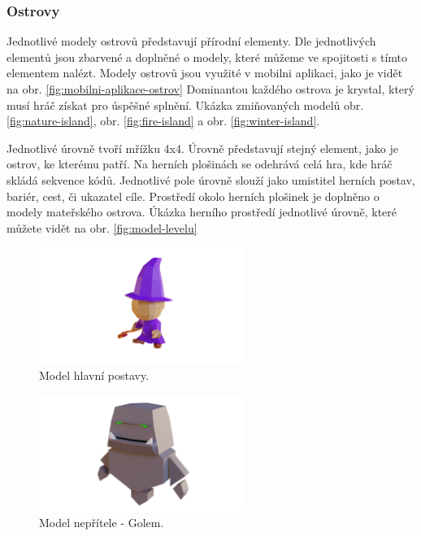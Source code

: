 \subsubsection{Ostrovy}
Jednotlivé modely ostrovů představují přírodní elementy. Dle jednotlivých elementů jsou zbarvené a doplněné o modely, které můžeme ve spojitosti s tímto elementem nalézt. Modely ostrovů jsou využité v mobilni aplikaci, jako je vidět na obr. \ref{fig:mobilni-aplikace-ostrov} Dominantou každého ostrova je krystal, který musí hráč získat pro úspěšné splnění. Ukázka zmiňovaných modelů obr. \ref{fig:nature-island}, obr. \ref{fig:fire-island} a obr. \ref{fig:winter-island}.

Jednotlivé úrovně tvoří mřížku 4x4. Úrovně představují stejný element, jako je ostrov, ke kterému patří. Na herních plošinách se odehrává celá hra, kde hráč skládá sekvence kódů. Jednotlivé pole úrovně slouží jako umistitel herních postav, bariér, cest, či ukazatel cíle. Prostředí okolo herních plošinek je doplněno o modely mateřského ostrova. Úkázka herního prostředí jednotlivé úrovně, které můžete vidět na obr. \ref{fig:model-levelu}

\begin{figure}[h]
    \centering
    \includegraphics[width=0.6\textwidth]{img/hlavni-postava.png}
    \caption{Model hlavní postavy.}
    \label{fig:hlavni-postava}
\end{figure}

\begin{figure}[h]
    \centering
    \includegraphics[width=0.6\textwidth]{img/nepritel-golem.png}
    \caption{Model nepřítele - Golem.}
    \label{fig:nepritel-golem}
\end{figure}

